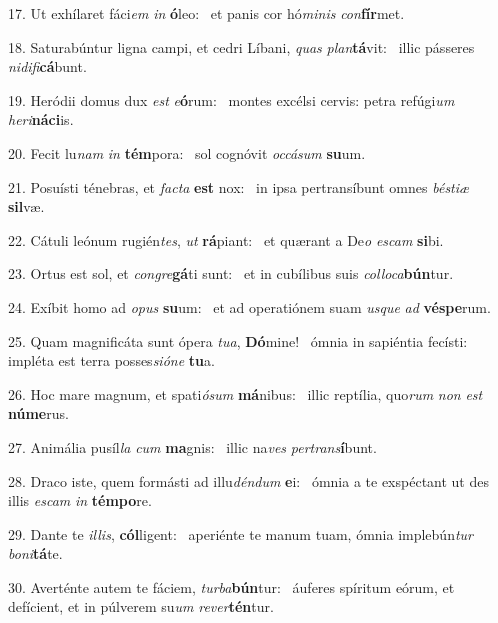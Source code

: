 17. Ut exhílaret fáci\textit{em} \textit{in} \textbf{ó}leo: \ast\  et panis cor hó\textit{mi}\textit{nis} \textit{con}\textbf{fír}met.\

18. Saturabúntur ligna campi, et cedri Líbani, \textit{quas} \textit{plan}\textbf{tá}vit: \ast\  illic pásseres \textit{ni}\textit{di}\textit{fi}\textbf{cá}bunt.\

19. Heródii domus dux \textit{est} \textit{e}\textbf{ó}rum: \ast\  montes excélsi cervis: petra refúgi\textit{um} \textit{he}\textit{ri}\textbf{ná}\textbf{ci}is.\

20. Fecit lu\textit{nam} \textit{in} \textbf{tém}pora: \ast\  sol cognóvit \textit{oc}\textit{cá}\textit{sum} \textbf{su}um.\

21. Posuísti ténebras, et \textit{fac}\textit{ta} \textbf{est} nox: \ast\  in ipsa pertransíbunt omnes \textit{bés}\textit{ti}\textit{æ} \textbf{sil}væ.\

22. Cátuli leónum rugién\textit{tes}, \textit{ut} \textbf{rá}piant: \ast\  et quærant a De\textit{o} \textit{es}\textit{cam} \textbf{si}bi.\

23. Ortus est sol, et \textit{con}\textit{gre}\textbf{gá}ti sunt: \ast\  et in cubílibus suis \textit{col}\textit{lo}\textit{ca}\textbf{bún}tur.\

24. Exíbit homo ad \textit{o}\textit{pus} \textbf{su}um: \ast\  et ad operatiónem suam \textit{us}\textit{que} \textit{ad} \textbf{vés}\textbf{pe}rum.\

25. Quam magnificáta sunt ópera \textit{tu}\textit{a}, \textbf{Dó}mine! \ast\  ómnia in sapiéntia fecísti: impléta est terra posses\textit{si}\textit{ó}\textit{ne} \textbf{tu}a.\

26. Hoc mare magnum, et spati\textit{ó}\textit{sum} \textbf{má}nibus: \ast\  illic reptília, quo\textit{rum} \textit{non} \textit{est} \textbf{nú}\textbf{me}rus.\

27. Animália pusíl\textit{la} \textit{cum} \textbf{ma}gnis: \ast\  illic na\textit{ves} \textit{per}\textit{trans}\textbf{í}bunt.\

28. Draco iste, quem formásti ad illu\textit{dén}\textit{dum} \textbf{e}i: \ast\  ómnia a te exspéctant ut des illis \textit{es}\textit{cam} \textit{in} \textbf{tém}\textbf{po}re.\

29. Dante te \textit{il}\textit{lis}, \textbf{cól}ligent: \ast\  aperiénte te manum tuam, ómnia implebún\textit{tur} \textit{bo}\textit{ni}\textbf{tá}te.\

30. Averténte autem te fáciem, \textit{tur}\textit{ba}\textbf{bún}tur: \ast\  áuferes spíritum eórum, et defícient, et in púlverem su\textit{um} \textit{re}\textit{ver}\textbf{tén}tur.\

